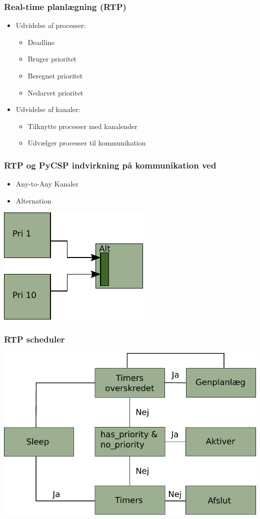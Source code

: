 \documentclass[12pt]{beamer}
\begin{document}
\begin{frame}
  \frametitle{Real-time planlægning (RTP)}
  \begin{itemize}
	\item Udvidelse af processer:
	  \begin{itemize}   
		\item Deadline
		\item Bruger prioritet
		\item Beregnet prioritet	
		\item Nedarvet prioritet
	  \end{itemize}
	\item Udvidelse af kanaler:
	  \begin{itemize}   
		\item Tilknytte processer med kanalender
		\item Udvælger processer til kommunikation
	  \end{itemize}
\end{itemize}
\end{frame}


\begin{frame}
	\frametitle{RTP og PyCSP indvirkning på kommunikation ved}
	\begin{itemize}
		\item Any-to-Any Kanaler 
	 	\item Alternation
	\end{itemize} 
\begin{center}
	\includegraphics[scale=0.7]{alt-inheritance.pdf} 
\end{center}
\end{frame} 


\begin{frame}
  \frametitle{RTP scheduler}
\includegraphics[scale=0.9]{rtp-scheduler}
\end{frame}
\end{document}
